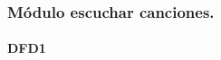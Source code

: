 \documentclass[12pt,a4paper]{article}
\begin{document}
\subsubsection{Módulo escuchar canciones.}
\paragraph{DFD1}
\begin{center}
\end{center}
\end{document}
